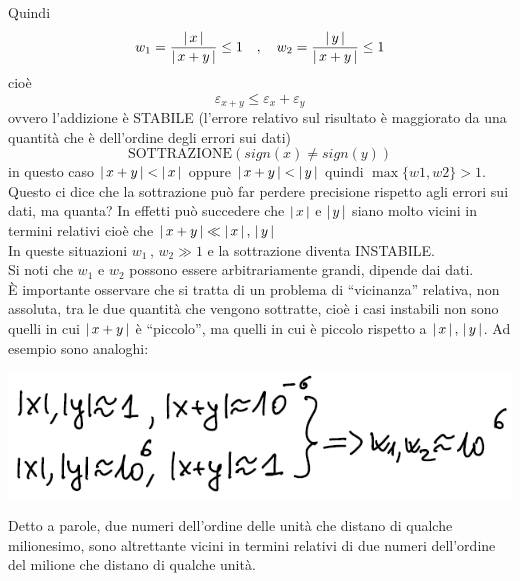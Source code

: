 \documentclass[12pt]{article}
\DeclarePairedDelimiter{\abs}{\lvert}{\rvert}
\begin{document}
Quindi
\[w_1 = \frac{\abs*{\,x\,}}{\abs*{\,x + y\,}} \le 1 \quad , \quad w_2 = \frac{\abs*{\,y\,}}{\abs*{\,x + y\,}} \le 1\]
cioè \[\varepsilon_{x+y} \le \varepsilon_x + \varepsilon_y\]
ovvero l’addizione è STABILE (l’errore relativo sul risultato è maggiorato da una quantità che è dell'ordine degli errori sui dati)
\[\text{SOTTRAZIONE} (sign(x) \ne sign(y))\]
in questo caso $\abs{\,x + y\,} < \abs{\,x\,}$ oppure $\abs{\,x + y\,} < \abs{\,y\,}$ quindi $\max \{w1 , w2\} > 1$. \\
Questo ci dice che la sottrazione può far perdere precisione rispetto agli errori sui dati, ma quanta? In effetti può succedere che $\abs{\,x\,}$ e $\abs{\,y\,}$ siano molto vicini in termini relativi cioè che $\abs{\,x + y\,} \ll \abs{\,x\,}\,,\,\abs{\,y\,}$ \\
In queste situazioni $w_1\,,\,w_2 \gg 1$ e la sottrazione diventa INSTABILE.\\
Si noti che $w_1$ e $w_2$ possono essere arbitrariamente grandi, dipende dai dati.\\
È importante osservare che si tratta di un problema di “vicinanza” relativa, non assoluta, tra le due quantità che vengono sottratte, cioè i casi instabili non sono quelli in cui $\abs{\,x + y\,}$ è “piccolo”, ma quelli in cui è piccolo rispetto a $\abs{\,x\,}\,,\,\abs{\,y\,}$.
Ad esempio sono analoghi: 
\begin{center}
    \includegraphics[scale=0.65]{img12.png}
\end{center}
Detto a parole, due numeri dell'ordine delle unità che distano di qualche milionesimo, sono altrettante vicini in termini relativi di due numeri dell'ordine del milione che distano di qualche unità.
\end{document}
